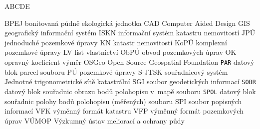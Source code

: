
\begin{seznamzkratek}{ABCDE}

	      {BPEJ}
	      {bonitovaná půdně ekologická jednotka}
	      {CAD}
	      {Computer Aided Design}
	      {GIS}
	      {geografický informační systém}
	      {ISKN}
	      {informační systém katastru nemovitostí}
	      {JPÚ}
	      {jednoduché pozemkové úpravy}
	      {KN}
	      {katastr nemovitostí}
	      {KoPÚ}
	      {komplexní pozemkové úpravy}
	      {LV}
	      {list vlastnictví}
	      {ObPÚ}
	      {obvod pozemkových úprav}
	      {OK}
	      {opravný koeficient výměr}
	      {OSGeo}
	      {Open Source Geospatial Foundation}
	      {\texttt{PAR}}
	      {datový blok parcel souboru }
	      {PÚ}
	      {pozemkové úpravy}
	      {S-JTSK}
	      {souřadnicový systém Jednotné trigonometrické sítě katastrální}
	      {SGI}
	      {soubor geodetických informací}
	      {\texttt{SOBR}}
	      {datový blok souřadnic obrazu bodů polohopisu v~mapě souboru }
	      {\texttt{SPOL}}
	      {datový blok souřadnic polohy bodů polohopisu (měřených) souboru }
	      {SPI}
	      {soubor popisných informací}
	      {VFK}
	      {výměnný formát katastru}
	      {VFP}
	      {výměnný formát pozemkových úprav}
	      {VÚMOP}
	      {Výzkumný ústav meliorací a ochrany půdy}
	      
\end{seznamzkratek}